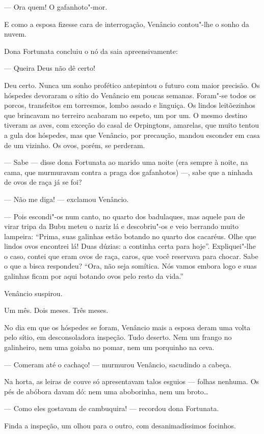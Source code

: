 --- Ora quem! O gafanhoto"-mor.

E como a esposa fizesse cara de interrogação, Venâncio contou"-lhe o
sonho da nuvem.

Dona Fortunata concluiu o nó da saia apreensivamente:

--- Queira Deus não dê certo!

Deu certo. Nunca um sonho profético antepintou o futuro com maior
precisão. Os hóspedes devoraram o sítio do Venâncio em poucas semanas.
Foram"-se todos os porcos, transfeitos em torresmos, lombo assado e
linguiça. Os lindos leitõezinhos que brincavam no terreiro acabaram no
espeto, um por um. O mesmo destino tiveram as aves, com exceção do casal
de Orpingtons, amarelas, que muito tentou a gula dos hóspedes, mas que
Venâncio, por precaução, mandou esconder em casa de um vizinho. Os ovos,
porém, se perderam.

--- Sabe --- disse dona Fortunata ao marido uma noite (era sempre à
noite, na cama, que murmuravam contra a praga dos gafanhotos) ---, sabe
que a ninhada de ovos de raça já se foi?

--- Não me diga! --- exclamou Venâncio.

--- Pois escondi"-os num canto, no quarto dos badulaques, mas aquele pau
de virar tripa da Bubu meteu o nariz lá e descobriu"-os e veio berrando
muito lampeira: ``Prima, suas galinhas estão botando no quarto dos
cacaréus. Olhe que lindos ovos encontrei lá! Duas dúzias: a continha
certa para hoje''. Expliquei"-lhe o caso, contei que eram ovos de raça,
caros, que você reservava para chocar. Sabe o que a bisca respondeu?
``Ora, não seja somítica. Nós vamos embora logo e suas galinhas ficam
por aqui botando ovos pelo resto da vida.''

Venâncio suspirou.

Um mês. Dois meses. Três meses.

No dia em que os hóspedes se foram, Venâncio mais a esposa deram uma
volta pelo sítio, em desconsoladora inspeção. Tudo deserto. Nem um
frango no galinheiro, nem uma goiaba no pomar, nem um porquinho na ceva.

--- Comeram até o cachaço! --- murmurou Venâncio, sacudindo a cabeça.

Na horta, as leiras de couve só apresentavam talos esguios --- folhas
nenhuma. Os pés de abóbora davam dó: nem uma aboborinha, nem um broto\ldots{}

--- Como eles gostavam de cambuquira! --- recordou dona Fortunata.

Finda a inspeção, um olhou para o outro, com desanimadíssimos focinhos.

